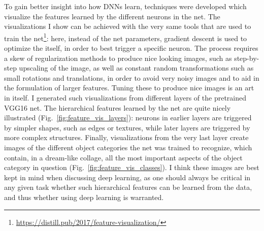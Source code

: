 			To gain better insight into how \acp{DNN} learn, techniques were developed which visualize the features learned by the different neurons in the net.
			The visualizations I show can be achieved with the very same tools that are used to train the net\footnote{\url{https://distill.pub/2017/feature-visualization/}}: here, instead of the net parameters, gradient descent is used to optimize the  itself, in order to best trigger a specific neuron.
			The process requires a skew of regularization methods to produce nice looking images, such as step-by-step upscaling of the image, as well as constant random transformations such as small rotations and translations, in order to avoid very noisy images and to aid in the formulation of larger features.
			Tuning these to produce nice images is an art in itself.
			I generated such visualizations from different layers of the pretrained VGG16 net.
			The hierarchical features learned by the net are quite nicely illustrated (Fig.~\ref{fig:feature_vis_layers}): neurons in earlier layers are triggered by simpler shapes, such as edges or textures, while later layers are triggered by more complex structures.
			Finally, visualizations from the very last layer create images of the different object categories the net was trained to recognize, which contain, in a dream-like collage, all the most important aspects of the object category in question (Fig.~\ref{fig:feature_vis_classes}).
			I think these images are best kept in mind when discussing deep learning, as one should always be critical in any given task whether such hierarchical features can be learned from the data, and thus whether using deep learning is warranted.
			
